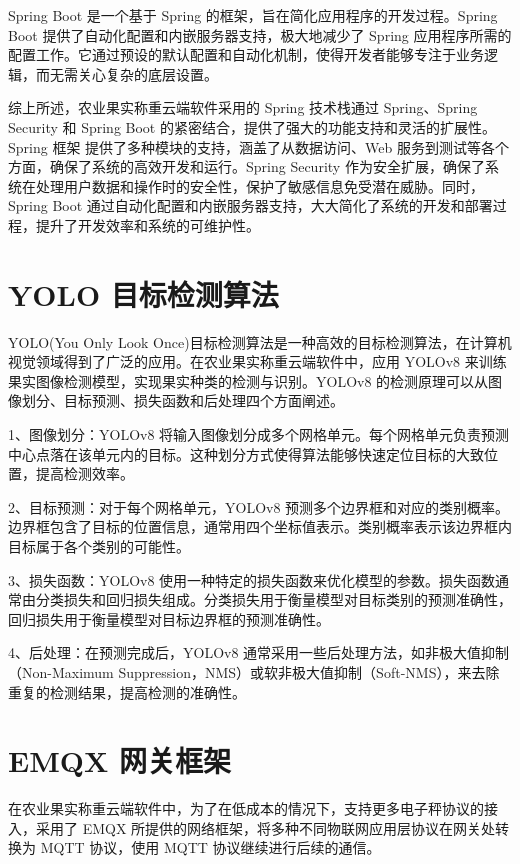 Spring Boot 是一个基于 Spring 的框架，旨在简化应用程序的开发过程。Spring Boot 提供了自动化配置和内嵌服务器支持，极大地减少了 Spring 应用程序所需的配置工作。它通过预设的默认配置和自动化机制，使得开发者能够专注于业务逻辑，而无需关心复杂的底层设置\cite{Spring-Boot-概述}。

综上所述，农业果实称重云端软件采用的 Spring 技术栈通过 Spring、Spring Security 和 Spring Boot 的紧密结合，提供了强大的功能支持和灵活的扩展性。Spring 框架 提供了多种模块的支持，涵盖了从数据访问、Web 服务到测试等各个方面，确保了系统的高效开发和运行。Spring Security 作为安全扩展，确保了系统在处理用户数据和操作时的安全性，保护了敏感信息免受潜在威胁。同时，Spring Boot 通过自动化配置和内嵌服务器支持，大大简化了系统的开发和部署过程，提升了开发效率和系统的可维护性。

\section{YOLO 目标检测算法}

YOLO(You Only Look Once)目标检测算法是一种高效的目标检测算法，在计算机视觉领域得到了广泛的应用\cite{Lin2019}。在农业果实称重云端软件中，应用 YOLOv8 来训练果实图像检测模型，实现果实种类的检测与识别。YOLOv8 的检测原理可以从图像划分、目标预测、损失函数和后处理四个方面阐述。

1、图像划分：YOLOv8 将输入图像划分成多个网格单元。每个网格单元负责预测中心点落在该单元内的目标。这种划分方式使得算法能够快速定位目标的大致位置，提高检测效率\cite{Liu2023-yolov8}。

2、目标预测：对于每个网格单元，YOLOv8 预测多个边界框和对应的类别概率。边界框包含了目标的位置信息，通常用四个坐标值表示。类别概率表示该边界框内目标属于各个类别的可能性。

3、损失函数：YOLOv8 使用一种特定的损失函数来优化模型的参数。损失函数通常由分类损失和回归损失组成。分类损失用于衡量模型对目标类别的预测准确性，回归损失用于衡量模型对目标边界框的预测准确性。

4、后处理：在预测完成后，YOLOv8 通常采用一些后处理方法，如非极大值抑制（Non-Maximum Suppression，NMS）或软非极大值抑制（Soft-NMS）\cite{SuperYOLO8}，来去除重复的检测结果，提高检测的准确性。

\section{EMQX 网关框架}

在农业果实称重云端软件中，为了在低成本的情况下，支持更多电子秤协议的接入，采用了 EMQX 所提供的网络框架，将多种不同物联网应用层协议在网关处转换为 MQTT 协议，使用 MQTT 协议继续进行后续的通信。

